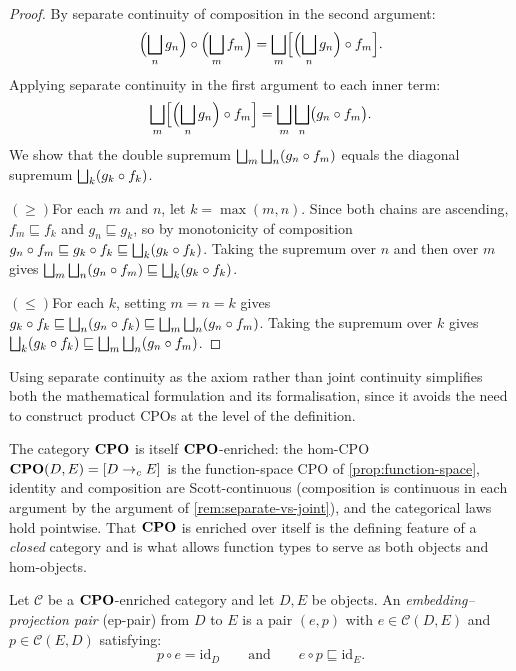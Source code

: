 \begin{proof}
By separate continuity of composition in the second argument:
\[
  \Bigl(\bigsqcup_n g_n\Bigr) \circ \Bigl(\bigsqcup_m f_m\Bigr)
    = \bigsqcup_m \Bigl[\Bigl(\bigsqcup_n g_n\Bigr) \circ f_m\Bigr].
\]
Applying separate continuity in the first argument to each inner term:
\[
  \bigsqcup_m \Bigl[\Bigl(\bigsqcup_n g_n\Bigr) \circ f_m\Bigr]
    = \bigsqcup_m \bigsqcup_n \bigl(g_n \circ f_m\bigr).
\]
We show that the double supremum $\bigsqcup_m \bigsqcup_n (g_n \circ f_m)$
equals the diagonal supremum $\bigsqcup_k (g_k \circ f_k)$.

\noindent$(\geq)$\quad For each $m$ and $n$, let $k = \max(m,n)$. Since
both chains are ascending, $f_m \sqsubseteq f_k$ and
$g_n \sqsubseteq g_k$, so by monotonicity of composition
$g_n \circ f_m \sqsubseteq g_k \circ f_k \sqsubseteq
\bigsqcup_k (g_k \circ f_k)$.
Taking the supremum over $n$ and then over $m$ gives
$\bigsqcup_m \bigsqcup_n (g_n \circ f_m) \sqsubseteq \bigsqcup_k (g_k \circ f_k)$.

\noindent$(\leq)$\quad For each $k$, setting $m = n = k$ gives
$g_k \circ f_k \sqsubseteq \bigsqcup_n (g_n \circ f_k) \sqsubseteq
\bigsqcup_m \bigsqcup_n (g_n \circ f_m)$.
Taking the supremum over $k$ gives
$\bigsqcup_k (g_k \circ f_k) \sqsubseteq \bigsqcup_m \bigsqcup_n (g_n \circ f_m)$.
\end{proof}

Using separate continuity as the axiom rather than joint continuity
simplifies both the mathematical formulation and its formalisation, since
it avoids the need to construct product CPOs at the level of the
definition.

\begin{example}
\label{ex:cpo-self-enriched}
The category $\mathbf{CPO}$ is itself $\mathbf{CPO}$-enriched: the hom-CPO
$\mathbf{CPO}(D, E) = [D \to_{c} E]$ is the function-space CPO of
\cref{prop:function-space}, identity and composition are
Scott-continuous (composition is continuous in each argument by the
argument of \cref{rem:separate-vs-joint}), and the categorical laws hold
pointwise. That $\mathbf{CPO}$ is enriched over itself is the defining feature
of a \emph{closed} category and is what allows function types to serve
as both objects and hom-objects.
\end{example}

\begin{definition}
\label{def:ep-pair}
Let $\mathcal{C}$ be a $\mathbf{CPO}$-enriched category and let $D, E$ be
objects. An \emph{embedding--projection pair} (ep-pair) from $D$ to $E$
is a pair $(e, p)$ with $e \in \mathcal{C}(D, E)$ and
$p \in \mathcal{C}(E, D)$ satisfying:
\[
  p \circ e = \mathrm{id}_D
  \qquad\text{and}\qquad
  e \circ p \sqsubseteq \mathrm{id}_E.
\]
\end{definition}

